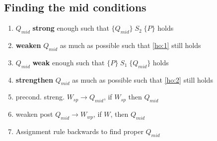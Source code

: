 {\subsection*{Finding the mid conditions}
\begin{enumerate}
\item\label{ho:1} $Q_{mid}$ \textbf{strong} enough such that $\{Q_{mid}\}\;S_{2}\;\{P\}$ holds
\item \textbf{weaken} $Q_{mid}$ as much as possible such that \ref{ho:1} still holds
\item\label{ho:2} $Q_{mid}$ \textbf{weak} enough such that $\{P\}\;S_{1}\;\{Q_{mid}\}$ holds
\item\textbf{strengthen} $Q_{mid}$ as much as possible such that \ref{ho:2} still holds
\item[] precond. streng. $W_{sp} \rightarrow Q_{mid}$, if $W_{sp}$ then $Q_{mid}$
\item[] weaken post $Q_{mid} \rightarrow W_{wp}$, if $W$, then $Q_{mid}$
\item Assignment rule backwards to find proper $Q_{mid}$
\end{enumerate}
%
%

}
